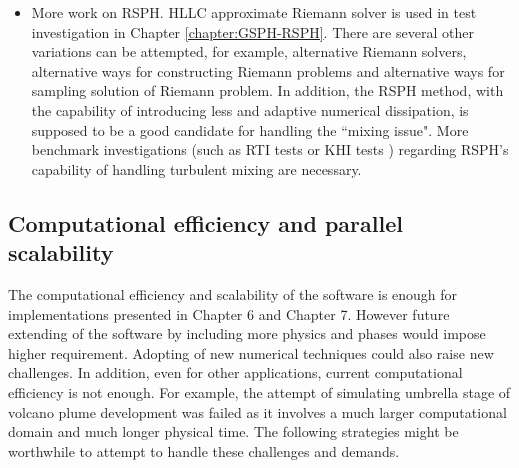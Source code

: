 \begin{itemize}
\item More work on RSPH. HLLC approximate Riemann solver is used in test investigation in Chapter \ref{chapter:GSPH-RSPH}. There are several other variations can be attempted, for example, alternative Riemann solvers, alternative ways for constructing Riemann problems and alternative ways for sampling solution of Riemann problem. In addition, the RSPH method, with the capability of introducing less and adaptive numerical dissipation, is supposed to be a good candidate for handling the ``mixing issue". More benchmark investigations (such as RTI tests or KHI tests \citep{price2008modelling,cha2010kelvin}) regarding RSPH's capability of handling turbulent mixing are necessary.
\end{itemize}

\subsection{Computational efficiency and parallel scalability}
The computational efficiency and scalability of the software is enough for implementations presented in Chapter 6 and Chapter 7. However future extending of the software by including more physics and phases would impose higher requirement. Adopting of new numerical techniques could also raise new challenges. In addition, even for other applications, current computational efficiency is not enough. For example, the attempt of simulating umbrella stage of volcano plume development was failed as it involves a much larger computational domain and much longer physical time. The following strategies might be worthwhile to attempt to handle these challenges and demands. 

